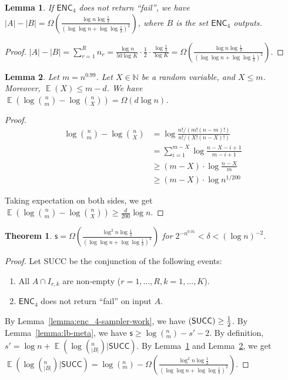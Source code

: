 \documentclass[10pt]{article}
\DeclareMathOperator*{\E}{\mathbb{E}}
\let\Pr\relax
\DeclareMathOperator*{\Pr}{\mathbb{P}}
\newtheorem{theorem}{Theorem}
\newtheorem{lemma}{Lemma}
\newcommand{\success}{\textsf{SUCC}\xspace}
\newcommand{\enc}{\textsf{ENC}\xspace}
\newcommand{\s}{\textsf{s}\xspace}
\begin{document}
\begin{lemma} \label{lemma:words-saving}
  If $\enc_4$ does not return ``fail'', we have $|A|-|B|=\Omega(\frac{\log n \log \frac{1}{\delta}}{(\log\log n + \log\log \frac{1}{\delta})^2})$, where $B$ is the set $\enc_4$ outputs.
\end{lemma}

\begin{proof}
  $|A|-|B|=\sum_{r=1}^{R}{n_r}= \frac{\log n}{50 \log K} \cdot \frac{1}{2}\cdot \frac{\log \frac{1}{\delta}}{\log K}
  = \Omega(\frac{\log n \log \frac{1}{\delta}}{(\log\log n + \log\log \frac{1}{\delta})^2})$.
\end{proof}


\begin{lemma} \label{lemma:bits-saving}
  Let $m=n^{0.99}$. Let $X\in \mathbb{N}$ be a random variable, and $X\le m$. Moreover, $\E(X)\le m-d$. We have $\E(\log {n \choose m}-\log {n \choose X})=\Omega(d \log n)$.
\end{lemma}

\begin{proof}
  \begin{align*}
    \log {n \choose m}-\log {n \choose X}
    &=   \log \frac{n!/(m!(n-m)!)}{n!/(X!(n-X)!)} \\
    &=   \sum_{i=1}^{m-X}\log \frac{n-X-i+1}{m-i+1} \\
    &\ge (m-X)\cdot \log \frac{n-X}{m} \\
    &\ge (m-X)\cdot \log n^{1/200}
  \end{align*}
  
  Taking expectation on both sides, we get $\E(\log {n \choose m}-\log {n \choose X})\ge \frac{d}{200} \log n$. 
\end{proof}

\begin{theorem}
  $\s = \Omega(\frac{\log^2 n\log{\frac{1}{\delta}}}{(\log\log n+\log\log \frac{1}{\delta})^2})$ for $2^{-n^{0.01}}<\delta<(\log n)^{-2}$.
\end{theorem}

\begin{proof}
  Let \success be the conjunction of the following events:
  \begin{enumerate}
    \item All $A \cap I_{r,k}$ are non-empty ($r=1,\ldots, R, k=1,\ldots, K$).
    \item $\enc_4$ does not return ``fail'' on input $A$.
  \end{enumerate}
  By Lemma~\ref{lemma:enc_4-sampler-work}, we have $\Pr(\success)\ge \frac{1}{2}$. By Lemma~\ref{lemma:lb-meta}, we have $\s\ge \log (^n_m) - s' -2$. By definition, $s'=\log n + \E(\log (^n_{|B|})|\success)$. By Lemma~\ref{lemma:words-saving} and Lemma~\ref{lemma:bits-saving}, we get $\E(\log (^n_{|B|})|\success)=\log (^n_m)-\Omega(\frac{\log^2 n\log{\frac{1}{\delta}}}{(\log\log n+\log\log \frac{1}{\delta})^2})$. 
\end{proof}



\end{document}
